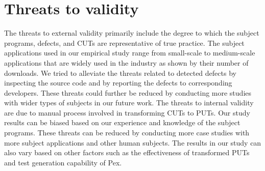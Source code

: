 \section{Threats to validity}
\label{sec:tov}

The threats to external validity primarily include the degree to which the subject programs, defects, and CUTs are representative of true practice. The subject applications used in our empirical study range from small-scale to medium-scale applications that are widely used in the industry as shown by their number of downloads. We tried to alleviate the threats related to detected defects by inspecting the source code and by reporting the defects to corresponding developers. These threats could further be reduced by conducting more studies with wider types of subjects in our future work. The threats to internal validity are due to manual process involved in transforming CUTs to PUTs. Our study results can be biased based on our experience and knowledge of the subject programs. These threats can be reduced by conducting more case studies with more subject applications and other human subjects. The results in our study can also vary based on other factors such as the effectiveness of transformed PUTs and test generation capability of Pex.